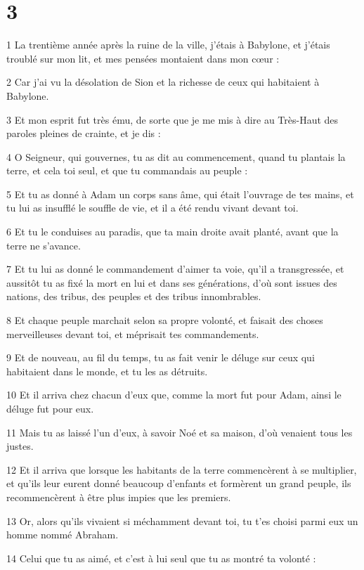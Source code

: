 \chapter{3}

\par 1 La trentième année après la ruine de la ville, j'étais à Babylone, et j'étais troublé sur mon lit, et mes pensées montaient dans mon cœur :
\par 2 Car j'ai vu la désolation de Sion et la richesse de ceux qui habitaient à Babylone.
\par 3 Et mon esprit fut très ému, de sorte que je me mis à dire au Très-Haut des paroles pleines de crainte, et je dis :
\par 4 O Seigneur, qui gouvernes, tu as dit au commencement, quand tu plantais la terre, et cela toi seul, et que tu commandais au peuple :
\par 5 Et tu as donné à Adam un corps sans âme, qui était l'ouvrage de tes mains, et tu lui as insufflé le souffle de vie, et il a été rendu vivant devant toi.
\par 6 Et tu le conduises au paradis, que ta main droite avait planté, avant que la terre ne s'avance.
\par 7 Et tu lui as donné le commandement d'aimer ta voie, qu'il a transgressée, et aussitôt tu as fixé la mort en lui et dans ses générations, d'où sont issues des nations, des tribus, des peuples et des tribus innombrables.
\par 8 Et chaque peuple marchait selon sa propre volonté, et faisait des choses merveilleuses devant toi, et méprisait tes commandements.
\par 9 Et de nouveau, au fil du temps, tu as fait venir le déluge sur ceux qui habitaient dans le monde, et tu les as détruits.
\par 10 Et il arriva chez chacun d'eux que, comme la mort fut pour Adam, ainsi le déluge fut pour eux.
\par 11 Mais tu as laissé l'un d'eux, à savoir Noé et sa maison, d'où venaient tous les justes.
\par 12 Et il arriva que lorsque les habitants de la terre commencèrent à se multiplier, et qu'ils leur eurent donné beaucoup d'enfants et formèrent un grand peuple, ils recommencèrent à être plus impies que les premiers.
\par 13 Or, alors qu'ils vivaient si méchamment devant toi, tu t'es choisi parmi eux un homme nommé Abraham.
\par 14 Celui que tu as aimé, et c'est à lui seul que tu as montré ta volonté :
